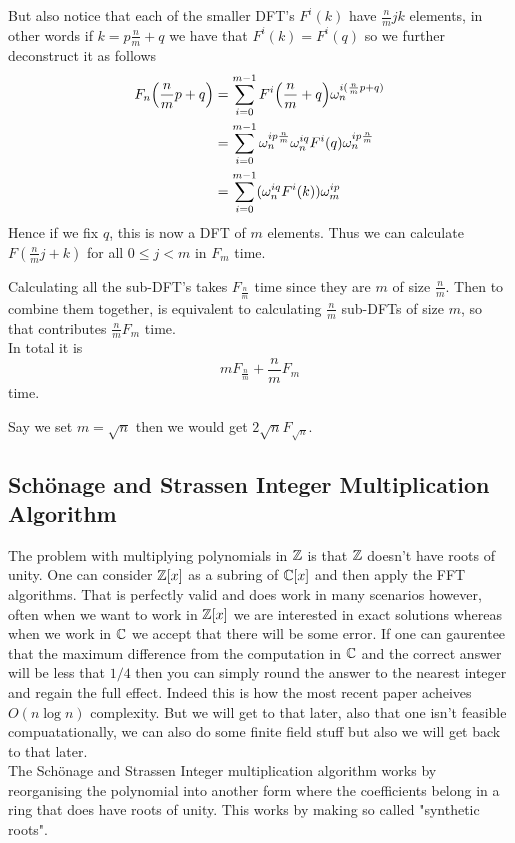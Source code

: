 But also notice that each of the smaller DFT's $F^i(k)$ have $\frac{n}{m}jk$ elements, in other words if $k = p\frac{n}{m} + q$ we have that $F^i(k) = F^i(q)$ so we further deconstruct it as follows
\begin{align*}
    F_n\bb{\frac{n}{m}p + q} &= \sum^{m-1}_{i=0} F^i\bb{\frac{n}{m} + q}\omega^{i(\frac{n}{m}p + q)}_n\\
    &= \sum^{m-1}_{i=0} \omega^{ip\frac{n}{m}}_n \omega_n^{iq} F^i(q)\omega^{ip\frac{n}{m}}_n\\
    &= \sum^{m-1}_{i=0} (\omega^{iq}_n F^i(k))\omega^{ip}_m\\
\end{align*}
Hence if we fix $q$, this is now a DFT of $m$ elements. Thus we can calculate $F(\frac{n}{m}j + k)$ for all $0 \leq j < m$ in $F_m$ time.

Calculating all the sub-DFT's takes $F_{\frac{n}{m}}$ time since they are $m$ of size $\frac{n}{m}$. Then to combine them together, is equivalent to calculating $\frac{n}{m}$ sub-DFTs of size $m$, so that contributes $\frac{n}{m}F_{m}$ time.\\
In total it is 
\[
    mF_{\frac{n}{m}} + \frac{n}{m}F_m    
\]
time.

Say we set $m = \sqrt{n}$ then we would get $2\sqrt{n}F_{\sqrt{n}}$. 

\subsection{Sch\"{o}nage and Strassen Integer Multiplication Algorithm}
\label{subsec:schon-strass}

The problem with multiplying polynomials in ${\mathbb Z}$ is that ${\mathbb Z}$ doesn't have roots of unity. One can consider ${\mathbb Z}[x]$ as a subring of $\mathbb{C}[x]$ and then apply the FFT algorithms. That is perfectly valid and does work in many scenarios however, often when we want to work in ${\mathbb Z}[x]$ we are interested in exact solutions whereas when we work in $\mathbb{C}$ we accept that there will be some error. If one can gaurentee that the maximum difference from the computation in $\mathbb{C}$ and the correct answer will be less that $1/4$ then you can simply round the answer to the nearest integer and regain the full effect. Indeed this is how the most recent paper acheives $O(n\log n)$ complexity. But we will get to that later, also that one isn't feasible compuatationally, we can also do some finite field stuff but also we will get back to that later.\\
The Sch\"{o}nage and Strassen Integer multiplication algorithm works by reorganising the polynomial into another form where the coefficients belong in a ring that does have roots of unity. This works by making so called "synthetic roots".




